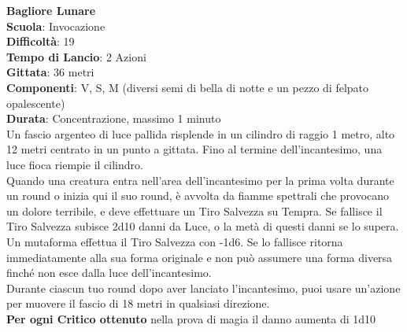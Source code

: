 \begin{multicols}{2}


\medskip\textbf{Bagliore Lunare}\\
\textbf{Scuola}: Invocazione\\
\textbf{Difficoltà}: 19\\
\textbf{Tempo di Lancio}: 2 Azioni\\
\textbf{Gittata}: 36 metri\\
\textbf{Componenti}: V, S, M (diversi semi di bella di notte e un pezzo di felpato opalescente)\\
\textbf{Durata}: Concentrazione, massimo 1 minuto\\
Un fascio argenteo di luce pallida risplende in un cilindro di raggio 1 metro, alto 12 metri centrato in un punto a gittata. Fino al termine dell'incantesimo, una luce fioca riempie il cilindro. \\
Quando una creatura entra nell'area dell'incantesimo per la prima volta durante un round o inizia qui il suo round, è avvolta da fiamme spettrali che provocano un dolore terribile, e deve effettuare un Tiro Salvezza su Tempra. Se fallisce il Tiro Salvezza subisce 2d10 danni da Luce, o la metà di questi danni se lo supera. Un mutaforma effettua il Tiro Salvezza con -1d6. Se lo fallisce ritorna immediatamente alla sua forma originale e non può assumere una forma diversa finché non esce dalla luce dell'incantesimo.\\
Durante ciascun tuo round dopo aver lanciato l'incantesimo, puoi usare un'azione per muovere il
fascio di 18 metri in qualsiasi direzione. \\
\textbf{Per ogni Critico ottenuto} nella prova di magia il danno aumenta di 1d10


\end{multicols}

